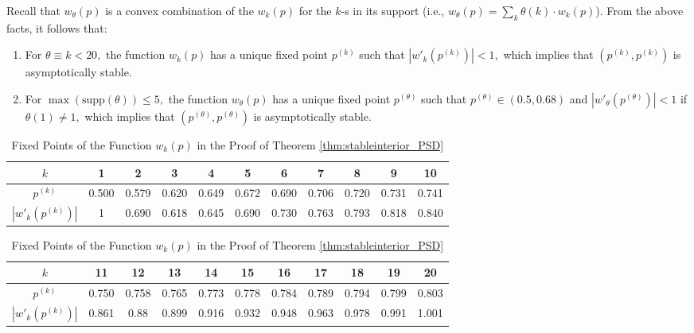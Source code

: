 \documentclass[12pt]{article}
\providecommand{\tabularnewline}{\\}
\numberwithin{equation}{section}
\numberwithin{figure}{section}
\theoremstyle{definition}
\theoremstyle{plain}
\theoremstyle{plain}
\theoremstyle{plain}
\theoremstyle{remark}
\theoremstyle{plain}
\theoremstyle{plain}
\begin{document}
Recall that $w_\theta(p)$ is a convex combination of the $w_k(p)$ for the $k$-s in its support 
(i.e., $w_\theta(p)=\sum_{k}\theta\left(k\right)\cdot w_{k}\left(p\right)$).  From the above facts, it follows that:
\begin{enumerate}
    \item  For $\theta \equiv k < 20,$ the function $w_k(p)$ has a unique fixed point $p^{(k)}$ such that $|w'_k(p^{(k)})| < 1,$ which implies that $(p^{(k)}, p^{(k)})$ is asymptotically stable.
    \item For $\max(\textrm{supp}(\theta)) \leq 5,$ the function $w_{\theta}(p)$ has a unique fixed point $p^{(\theta)}$ such that $p^{(\theta)} \in (0.5,0.68)$ and $|w'_\theta(p^{(\theta)})| < 1$ if $\theta(1) \neq 1,$ 
    which implies that $(p^{(\theta)}, p^{(\theta)})$ is asymptotically stable.
\end{enumerate}

\begin{table}[h]
\caption{Fixed Points of the Function $w_k(p)$ in the Proof of Theorem \ref{thm:stableinterior_PSD}} %
\centering

\begin{tabular}{|c|c|c|c|c|c|c|c|c|c|c|}
\hline 
$k$ & 1 & 2 & 3 & 4 & 5 & 6 & 7 & 8 & 9 & 10\tabularnewline
\hline 
$p^{\left(k\right)}$ & 0.500 & 0.579 & 0.620 & 0.649 & 0.672 & 0.690 & 0.706 & 0.720 & 0.731 & 0.741\tabularnewline
\hline 
$\ensuremath{|w'_{k}(p^{\left(k\right)})|}$ & 1 & 0.690 & 0.618 & 0.645 & 0.690 & 0.730 & 0.763 & 0.793 & 0.818 & 0.840 \tabularnewline
\hline 
\end{tabular}

\medskip{}

\begin{tabular}{|c|c|c|c|c|c|c|c|c|c|c|}
\hline 
$k$ & 11 & 12 & 13 & 14 & 15 & 16 & 17 & 18 & 19 & 20\tabularnewline
\hline 
$p^{\left(k\right)}$ & 0.750 & 0.758 & 0.765 & 0.773 & 0.778 & 0.784 & 0.789 & 0.794 & 0.799 & 0.803\tabularnewline
\hline 
$\ensuremath{|w'_{k}(p^{\left(k\right)})|}$ & 0.861 & 0.88 & 0.899 & 0.916 & 0.932 & 0.948 & 0.963 & 0.978 & 0.991 & 1.001 \tabularnewline
\hline 
\end{tabular}

 \label{table:fixedpoints} %
\end{table}
\end{document}
